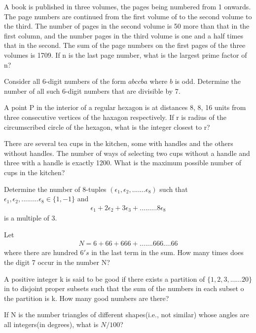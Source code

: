 \item A book is published in three volumes, the pages being numbered from 1 onwards. The page numbers are continued from the first volume of to the second volume to the third. The number of pages in the second volume is 50 more than that in the first column, and the number pages in the third volume is one and a half times that in the second. The sum of the page numbers on the first pages of the three volumes is 1709. If n is the last page number, what is the largest prime factor of n?

\item Consider all 6-digit numbers of the form $abccba$ where $b$ is odd. Determine the number of all such 6-digit numbers that are divisible by 7.

\item A point P in the interior of a regular hexagon is at distances 8, 8, 16 units from three consecutive vertices of the haxagon respectively. If r is radius of the circumscribed circle of the hexagon, what is the integer closest to r?

\item There are several tea cups in the kitchen, some with handles and the others without handles. The number of ways of selecting two cups without a handle and three with a handle is exactly 1200. What is the maximum possible number of cups in the kitchen?

\item Determine the number of 8-tuples $(\epsilon_1, \epsilon_2,.......\epsilon_8)$ such that $\epsilon_1, \epsilon_2,.........\epsilon_8 \in \{1, -1\}$ and
\begin{align*}
\epsilon_1 + 2\epsilon_2 + 3\epsilon_3 +.........8\epsilon_8
\end{align*}
is a multiple of 3.

\item Let
\begin{align*}
N = 6 + 66 + 666 +.......666....66
\end{align*}
where there are hundred $6's$ in the last term in the sum. How many times does the digit 7 occur in the number N?

\item A positive integer k is said to be good if there exists a partition of $\{1, 2, 3,......20\}$ in to disjoint proper subsets such that the sum of the numbers in each subset o the partition is k. How many good numbers are there?

\item If N is the number triangles of different shapes(i.e., not similar) whose angles are all integers(in degrees), what is $N/100$?

